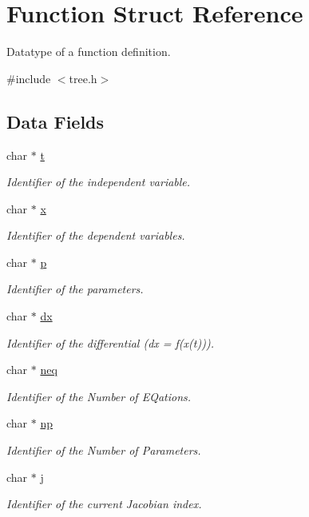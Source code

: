 \hypertarget{structFunction}{\section{Function Struct Reference}
\label{structFunction}
}


Datatype of a function definition.  




{\ttfamily \#include $<$tree.\-h$>$}

\subsection*{Data Fields}
\begin{DoxyCompactItemize}
\item 
char $\ast$ \hyperlink{structFunction_a21feba301403a65090791a94f26c9d92}{t}
\begin{DoxyCompactList}\small\item\em Identifier of the independent variable. \end{DoxyCompactList}\item 
char $\ast$ \hyperlink{structFunction_a87d9da60be62fb1a74b56404c392bf74}{x}
\begin{DoxyCompactList}\small\item\em Identifier of the dependent variables. \end{DoxyCompactList}\item 
char $\ast$ \hyperlink{structFunction_aaa1ebe818ec1c763a776cc580551f3e6}{p}
\begin{DoxyCompactList}\small\item\em Identifier of the parameters. \end{DoxyCompactList}\item 
char $\ast$ \hyperlink{structFunction_aa66668aed9b94cfd43d1d5fcad8e923d}{dx}
\begin{DoxyCompactList}\small\item\em Identifier of the differential (dx = f(x(t))). \end{DoxyCompactList}\item 
char $\ast$ \hyperlink{structFunction_a26607bec2385a751e572c5aa9976262d}{neq}
\begin{DoxyCompactList}\small\item\em Identifier of the Number of E\-Qations. \end{DoxyCompactList}\item 
char $\ast$ \hyperlink{structFunction_ac5e9e8f42513fbf549dcde4107b633d0}{np}
\begin{DoxyCompactList}\small\item\em Identifier of the Number of Parameters. \end{DoxyCompactList}\item 
char $\ast$ \hyperlink{structFunction_aabe3f0c55a8ab8de92abb1da25c055db}{j}
\begin{DoxyCompactList}\small\item\em Identifier of the current Jacobian index. \end{DoxyCompactList}\end{DoxyCompactItemize}


